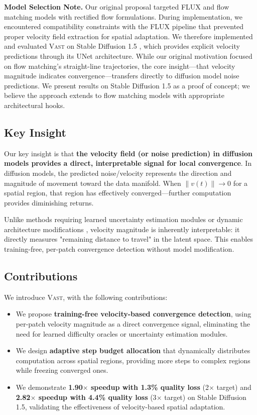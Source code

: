 \documentclass{article}
\newcommand{\vast}{\textsc{Vast}}
\newcommand{\flux}{\textsc{FLUX}}
\begin{document}
\textbf{Model Selection Note.} Our original proposal targeted \flux{} \citep{flux2024} and flow matching models with rectified flow formulations. During implementation, we encountered compatibility constraints with the \flux{} pipeline that prevented proper velocity field extraction for spatial adaptation. We therefore implemented and evaluated \vast{} on Stable Diffusion 1.5 \citep{rombach2022high}, which provides explicit velocity predictions through its UNet architecture. While our original motivation focused on flow matching's straight-line trajectories, the core insight---that velocity magnitude indicates convergence---transfers directly to diffusion model noise predictions. We present results on Stable Diffusion 1.5 as a proof of concept; we believe the approach extends to flow matching models with appropriate architectural hooks.

\subsection{Key Insight}

Our key insight is that \textbf{the velocity field (or noise prediction) in diffusion models provides a direct, interpretable signal for local convergence}. In diffusion models, the predicted noise/velocity represents the direction and magnitude of movement toward the data manifold. When $\|v(t)\| \rightarrow 0$ for a spatial region, that region has effectively converged---further computation provides diminishing returns.

Unlike methods requiring learned uncertainty estimation modules \citep{tang2024adadiff} or dynamic architecture modifications \citep{zhao2025dydit}, velocity magnitude is inherently interpretable: it directly measures "remaining distance to travel" in the latent space. This enables training-free, per-patch convergence detection without model modification.

\subsection{Contributions}

We introduce \vast{}, with the following contributions:

\begin{itemize}
    \item We propose \textbf{training-free velocity-based convergence detection}, using per-patch velocity magnitude as a direct convergence signal, eliminating the need for learned difficulty oracles or uncertainty estimation modules.
    \item We design \textbf{adaptive step budget allocation} that dynamically distributes computation across spatial regions, providing more steps to complex regions while freezing converged ones.
    \item We demonstrate \textbf{1.90$\times$ speedup with 1.3\% quality loss} (2$\times$ target) and \textbf{2.82$\times$ speedup with 4.4\% quality loss} (3$\times$ target) on Stable Diffusion 1.5, validating the effectiveness of velocity-based spatial adaptation.
\end{itemize}
\end{document}
